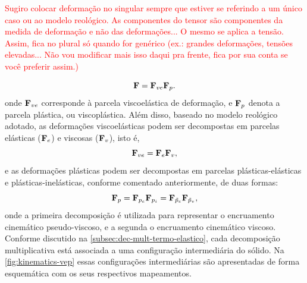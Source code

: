 \documentclass[Tese.tex]{subfiles}
\begin{document}
\textcolor{red}{Sugiro colocar deformação no singular sempre que estiver se referindo a um único caso ou ao modelo reológico. As componentes do tensor são componentes da medida de deformação e não das deformações... O mesmo se aplica a tensão. Assim, fica no plural só quando for genérico (ex.: grandes deformações, tensões elevadas... Não vou modificar mais isso daqui pra frente, fica por sua conta se você preferir assim.)}


\begin{equation}
\mathbf{F} = \mathbf{F}_{ve}\mathbf{F}_p. \label{eq:dec-mult-1}
\end{equation}
onde $\mathbf{F}_{ve}$ corresponde à parcela viscoelástica de deformação, e $\mathbf{F}_p$ denota a parcela plástica, ou viscoplástica. Além disso, baseado no modelo reológico adotado, as deformações viscoelásticas podem ser decompostas em parcelas elásticas ($\mathbf{F}_e$) e viscosas ($\mathbf{F}_v$), isto é,
\begin{equation}
\mathbf{F}_{ve} = \mathbf{F}_e\mathbf{F}_v, \label{eq:dec-mult-2}
\end{equation}
e as deformações plásticas podem ser decompostas em parcelas plásticas-elásticas e plásticas-inelásticas, conforme comentado anteriormente, de duas formas:
\begin{equation}
\mathbf{F}_p = \mathbf{F}_{p_e}\mathbf{F}_{p_i} = \mathbf{F}_{\tilde{p}_e}\mathbf{F}_{\tilde{p}_v}, \label{eq:dec-mult-3}
\end{equation}
onde a primeira decomposição é utilizada para representar o encruamento cinemático pseudo-viscoso, e a segunda o encruamento cinemático viscoso. Conforme discutido na \autoref{subsec:dec-mult-termo-elastico}, cada decomposição multiplicativa está associada a uma configuração intermediária do sólido. Na \autoref{fig:kinematics-vep} essas configurações intermediárias são apresentadas de forma esquemática com os seus respectivos mapeamentos.
\end{document}
